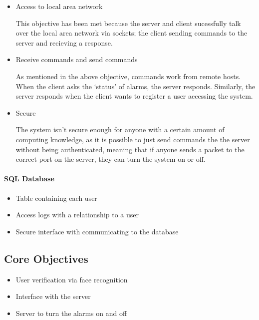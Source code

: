 \documentclass[a4paper]{article}
\begin{document}
			\begin{itemize}
				\item Access to local area network
                    
                    This objective has been met because the server and client sucessfully talk over the local area network
                    via sockets; the client sending commands to the server and recieving a response.

				\item Receive commands and send commands
                    
                    As mentioned in the above objective, commands work from remote hosts. When the client asks the `status' of
                    alarms, the server responds. Similarly, the server responds when the client wants to register a user 
                    accessing the system.
				\item Secure
                    
                    The system isn't secure enough for anyone with a certain amount of computing knowledge, as it is possible to
                    just send commands the the server without being authenticated, meaning that if anyone sends a packet to the
                    correct port on the server, they can turn the system on or off.
			\end{itemize}

		\paragraph{SQL Database}
		
			\begin{itemize}
				\item Table containing each user
				\item Access logs with a relationship to a user
				\item Secure interface with communicating to the database
			\end{itemize}

	\subsection{Core Objectives}
		
		\begin{itemize}
			\item User verification via face recognition
			\item Interface with the server
			\item Server to turn the alarms on and off
		\end{itemize}
\end{document}
